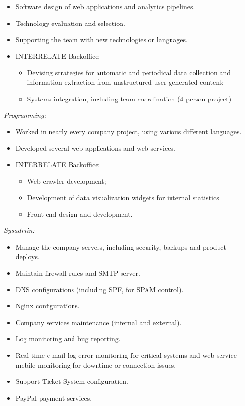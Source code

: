 \documentclass{friggeri-cv}
\begin{document}
\begin{entrylist}
{{\begin{itemize}
  \setlength\itemsep{.0175em}
  \item Software design of web applications and analytics pipelines.
  \item Technology evaluation and selection.
  \item Supporting the team with new technologies or languages.
  \item INTERRELATE Backoffice:
    \begin{itemize}
      \item Devising strategies for automatic and periodical data collection and information extraction from unstructured user-generated content;
      \item Systems integration, including team coordination (4 person project).
    \end{itemize}
\end{itemize}}
\vspace{0.3em}
{\normalsize \emph{Programming:}}
\vspace{0.175em}
{\normalsize \begin{itemize}
  \setlength\itemsep{.0175em}
  \item Worked in nearly every company project, using various different languages.
  \item Developed several web applications and web services.
  \item INTERRELATE Backoffice:
    \begin{itemize}
      \item Web crawler development;
      \item Development of data visualization widgets for internal statistics;
      \item Front-end design and development.
    \end{itemize}
\end{itemize}}
\vspace{0.3em}
{\normalsize \emph{Sysadmin:}}
\vspace{0.175em}
{\normalsize \begin{itemize}
  \setlength\itemsep{.0175em}
  \item Manage the company servers, including security, backups and product deploys.
  \item Maintain firewall rules and SMTP server.
  \item DNS configurations (including SPF, for SPAM control).
  \item Nginx configurations.
  \item Company services maintenance (internal and external).
  \item Log monitoring and bug reporting.
  \item Real-time e-mail log error monitoring for critical systems and web service mobile monitoring for downtime or connection issues.
  \item Support Ticket System configuration.
  \item PayPal payment services.
\end{itemize}}}
\end{entrylist}
\end{document}
